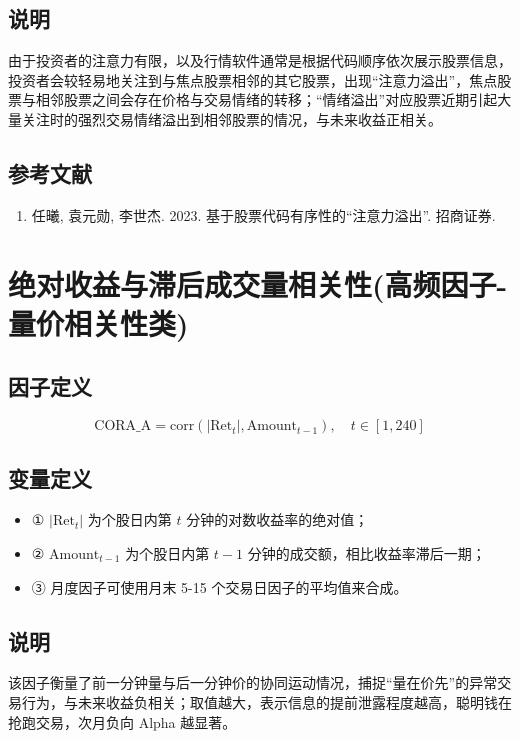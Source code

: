 \documentclass{article}
\begin{document}
\subsection{说明}
由于投资者的注意力有限，以及行情软件通常是根据代码顺序依次展示股票信息，投资者会较轻易地关注到与焦点股票相邻的其它股票，出现“注意力溢出”，焦点股票与相邻股票之间会存在价格与交易情绪的转移；“情绪溢出”对应股票近期引起大量关注时的强烈交易情绪溢出到相邻股票的情况，与未来收益正相关。

\subsection{参考文献}
\begin{enumerate}
    \item 任曦, 袁元勋, 李世杰. 2023. 基于股票代码有序性的“注意力溢出”. 招商证券.
\end{enumerate}

\section{绝对收益与滞后成交量相关性(高频因子-量价相关性类)}

\subsection{因子定义}
\begin{equation}
    \mathrm{CORA\_A} = \mathrm{corr}(|\mathrm{Ret}_t|, \mathrm{Amount}_{t-1}), \quad t \in [1, 240]
\end{equation}

\subsection{变量定义}
\begin{itemize}
    \item ① \( |\mathrm{Ret}_t| \) 为个股日内第 \( t \) 分钟的对数收益率的绝对值；
    \item ② \( \mathrm{Amount}_{t-1} \) 为个股日内第 \( t-1 \) 分钟的成交额，相比收益率滞后一期；
    \item ③ 月度因子可使用月末 5-15 个交易日因子的平均值来合成。
\end{itemize}

\subsection{说明}
该因子衡量了前一分钟量与后一分钟价的协同运动情况，捕捉“量在价先”的异常交易行为，与未来收益负相关；取值越大，表示信息的提前泄露程度越高，聪明钱在抢跑交易，次月负向 Alpha 越显著。
\end{document}

